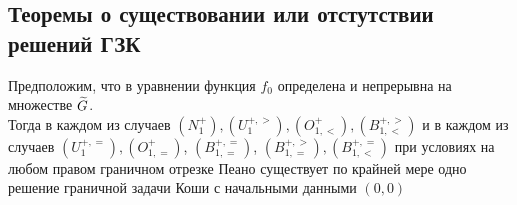 \subsection{Теоремы о существовании или отстутствии решений ГЗК}

\begin{theorem}\label{th:ex:bound:1}
    Предположим, что в уравнении  функция $ f_0 $ определена и непрерывна на множестве $ \widetilde{G} $. \\
    Тогда в каждом из случаев $ (N_1^+), (U_1^{+, >}), (O_{1, <}^+), (B_{1, <}^{+, >}) $ и в каждом из случаев $ (U_1^{+, =}), (O_{1, =}^+) $, $ (B_{1, =}^{+, =}) $, $ (B_{1, =}^{+, >}), (B_{1, <}^{+, =}) $ при условиях  на любом правом граничном отрезке Пеано существует по крайней мере одно решение граничной задачи Коши с начальными данными $ (0, 0) $
\end{theorem}

